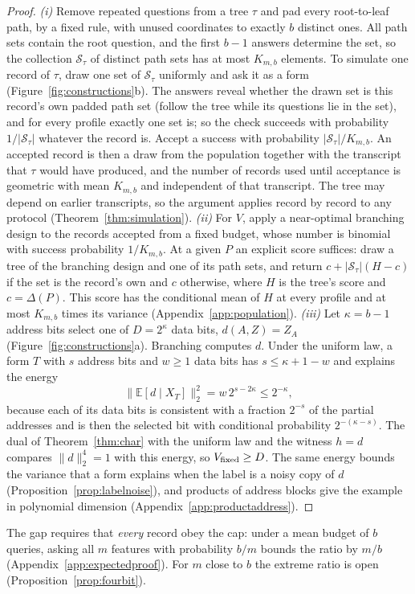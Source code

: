 \documentclass{article}
\newcommand{\E}{\mathbb{E}}
\begin{document}
\begin{proof}
\emph{(i)} Remove repeated questions from a tree $\tau$ and pad every root-to-leaf path, by a fixed rule, with unused coordinates to exactly $b$ distinct ones. All path sets contain the root question, and the first $b-1$ answers determine the set, so the collection $\mathcal S_\tau$ of distinct path sets has at most $K_{m,b}$ elements. To simulate one record of $\tau$, draw one set of $\mathcal S_\tau$ uniformly and ask it as a form (Figure~\ref{fig:constructions}b). The answers reveal whether the drawn set is this record's own padded path set (follow the tree while its questions lie in the set), and for every profile exactly one set is; so the check succeeds with probability $1/|\mathcal S_\tau|$ whatever the record is. Accept a success with probability $|\mathcal S_\tau|/K_{m,b}$. An accepted record is then a draw from the population together with the transcript that $\tau$ would have produced, and the number of records used until acceptance is geometric with mean $K_{m,b}$ and independent of that transcript. The tree may depend on earlier transcripts, so the argument applies record by record to any protocol (Theorem~\ref{thm:simulation}). \emph{(ii)} For $V$, apply a near-optimal branching design to the records accepted from a fixed budget, whose number is binomial with success probability $1/K_{m,b}$. At a given $P$ an explicit score suffices: draw a tree of the branching design and one of its path sets, and return $c+|\mathcal S_\tau|(H-c)$ if the set is the record's own and $c$ otherwise, where $H$ is the tree's score and $c=\Delta(P)$. This score has the conditional mean of $H$ at every profile and at most $K_{m,b}$ times its variance (Appendix~\ref{app:population}). \emph{(iii)} Let $\kappa=b-1$ address bits select one of $D=2^\kappa$ data bits, $d(A,Z)=Z_A$ (Figure~\ref{fig:constructions}a). Branching computes $d$. Under the uniform law, a form $T$ with $s$ address bits and $w\ge1$ data bits has $s\le\kappa+1-w$ and explains the energy
\begin{equation}
 \|\E[d\mid X_T]\|_2^2=w\,2^{s-2\kappa}\le2^{-\kappa},\label{eq:addressinformation}
\end{equation}
because each of its data bits is consistent with a fraction $2^{-s}$ of the partial addresses and is then the selected bit with conditional probability $2^{-(\kappa-s)}$. The dual of Theorem~\ref{thm:char} with the uniform law and the witness $h=d$ compares $\|d\|_2^4=1$ with this energy, so $V_{\rm fixed}\ge D$. The same energy bounds the variance that a form explains when the label is a noisy copy of $d$ (Proposition~\ref{prop:labelnoise}), and products of address blocks give the example in polynomial dimension (Appendix~\ref{app:productaddress}).
\end{proof}
The gap requires that \emph{every} record obey the cap: under a mean budget of $b$ queries, asking all $m$ features with probability $b/m$ bounds the ratio by $m/b$ (Appendix~\ref{app:expectedproof}). For $m$ close to $b$ the extreme ratio is open (Proposition~\ref{prop:fourbit}).
\end{document}
